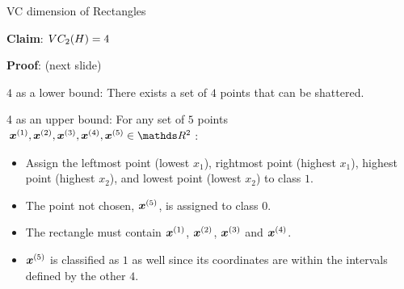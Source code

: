 \begin{vbframe}{VC dimension of Rectangles}
\lz

\textbf{Claim}: $VC_2(H) = 4$

\lz 

\textbf{Proof}: (next slide)

\framebreak

$4$ as a lower bound: There exists a set of $4$ points that can be shattered.

  \begin{figure}
      \centering
    \end{figure}

\framebreak

4 as an upper bound: For any set of $5$ points $\xv^{(1)}, \xv^{(2)}, \xv^{(3)}, \xv^{(4)}, \xv^{(5)} \in \R^2$:

\begin{itemize}
  \item Assign the leftmost point (lowest $x_1$), rightmost point (highest $x_1$), highest point (highest $x_2$), and lowest point (lowest $x_2$)  to class $1$.
  \item The point not chosen, $\bm{x}^{(5)}$, is assigned to class $0$.
  \item The rectangle must contain $\bm{x}^{(1)}$, $\bm{x}^{(2)}$, $\bm{x}^{(3)}$ and $\bm{x}^{(4)}$.
  \item $\bm{x}^{(5)}$ is classified as $1$ as well since its coordinates are within the intervals defined by the other $4$.
\end{itemize}


\end{vbframe}
